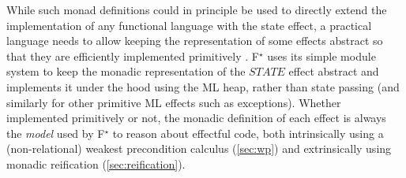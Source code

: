 \documentclass[sigplan,screen]{acmart}\settopmatter{}
\newcommand\fstar{F$^\star$\xspace}
\newcommand{\comm}[3]{\ifcheckpagebudget\else\ifdraft{\maybecolor{#1}[#2: #3]}\fi\fi}
\newcommand{\ch}[1]{\comm{teal}{CH}{#1}}
\newcommand{\chfoot}[1]{\ifdraft\footnote{\comm{teal}{CH}{#1}}\fi}
\begin{document}

While such monad definitions could in principle be used to directly
extend the implementation of any functional language with the state effect, a
practical language needs to allow keeping the representation of some
effects abstract so that they are efficiently implemented
primitively \cite{PeytonJones01}.
%
\fstar{} uses its simple module system to keep the monadic representation
of the \ls$STATE$ effect abstract and implements it under the hood
using the ML heap, rather than state passing (and similarly for
other primitive ML effects such as exceptions).
%
Whether implemented primitively or not, the monadic definition of each
effect is always the {\em model} used by \fstar{} to reason
about effectful code, both intrinsically using a (non-relational)
weakest precondition calculus (\autoref{sec:wp}) and extrinsically
using monadic reification (\autoref{sec:reification}).

\iffalse
In the case of state, the exposed operations in the module interface
are of course not \ls$get$ and \ls$put$, but the familiar and
efficiently implementable \ls$alloc$,
\ls$(!)$, and \ls$(:=)$ operations on individual reference cells
(where we postpone the specifications of these operations until \autoref{sec:wp}).
\begin{lstlisting}
val ref : Type -> Type
val alloc : #a:Type -> init:a -> STATE (ref a) ...
val (!) : #a:Type -> r:ref a -> STATE a ...
val (:=) : #a:Type -> r:ref a -> v:a -> STATE unit ...
\end{lstlisting}
%
All code with \ls$STATE$ effect is written against this
interface, as was the case with the \ls$sum_up$ and \ls$sum_dn$
functions from \autoref{sec:first-example}.
%
\fi
\end{document}
